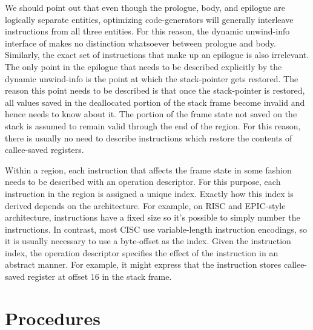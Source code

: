 \documentclass{article}
\begin{document}
We should point out that even though the prologue, body, and epilogue
are logically separate entities, optimizing code-generators will
generally interleave instructions from all three entities.  For this
reason, the dynamic unwind-info interface of  makes no
distinction whatsoever between prologue and body.  Similarly, the
exact set of instructions that make up an epilogue is also irrelevant.
The only point in the epilogue that needs to be described explicitly
by the dynamic unwind-info is the point at which the stack-pointer
gets restored.  The reason this point needs to be described is that
once the stack-pointer is restored, all values saved in the
deallocated portion of the stack frame become invalid and hence
 needs to know about it.  The portion of the frame
state not saved on the stack is assumed to remain valid through the end
of the region.  For this reason, there is usually no need to describe
instructions which restore the contents of callee-saved registers.

Within a region, each instruction that affects the frame state in some
fashion needs to be described with an operation descriptor.  For this
purpose, each instruction in the region is assigned a unique index.
Exactly how this index is derived depends on the architecture.  For
example, on RISC and EPIC-style architecture, instructions have a
fixed size so it's possible to simply number the instructions.  In
contrast, most CISC use variable-length instruction encodings, so it
is usually necessary to use a byte-offset as the index.  Given the
instruction index, the operation descriptor specifies the effect of
the instruction in an abstract manner.  For example, it might express
that the instruction stores callee-saved register  at offset 16
in the stack frame.

\section{Procedures}
\end{document}
